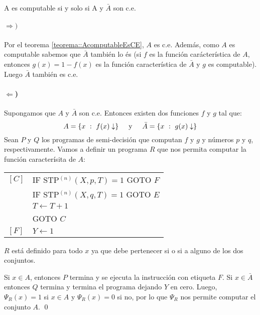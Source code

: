\begin{teorema}
	A es computable si y solo si A y $\bar{A}$ son c.e.
\end{teorema}

\begin{demo}
	\paragraph{$\bm{\Rightarrow})$} Por el teorema \ref{teorema::AcomputableEsCE}, $A$ es c.e. Además, como $A$ es computable sabemos que $\bar{A}$ también lo és (si $f$ es la función carácterística de $A$, entonces $g(x) = 1 - f(x)$ es la función característica de $\bar{A}$ y $g$ es computable). Luego $\bar{A}$ también es c.e.
		\paragraph{$\bm{\Leftarrow}$)} Supongamos que $A$ y $\bar{A}$ son c.e. Entonces existen dos funciones $f$ y $g$ tal que:
	$$A = \{ x~:~f(x)\downarrow\}\hspace*{0.5cm}\text{y}\hspace*{0.5cm} \bar{A} =\{x~:~g(x)\downarrow\}$$
	Sean $P$ y $Q$ los programas de semi-decisión que computan $f$ y $g$ y números $p$ y $q$, respectivamente. Vamos a definir un programa $R$ que nos permita computar la función caracterísita de $A$:

\begin{center}
	\begin{tabular}{ll}
		$[C]$ & IF STP$^{(n)}(X,p, T) = 1$ GOTO $F$ \\
		& IF STP$^{(n)}(X,q, T) = 1$ GOTO $E$ \\
		& $T\leftarrow T + 1$ \\
		& GOTO $C$ \\
		$[F]$ & $Y\leftarrow 1$
	\end{tabular}
\end{center} 
$R$ está definido para todo $x$ ya que debe pertenecer si o si a alguno de los dos conjuntos.	
\end{demo}
	\begin{demoPart}
 
 Si $x\in A$, entonces $P$ termina y se ejecuta la instrucción con etiqueta $F$. Si $x\in\bar{A}$ entonces $Q$ termina y termina el programa dejando $Y$ en cero. Luego, $\Psi_R(x) = 1$ si $x\in A$ y $\Psi_R(x) = 0$ si no, por lo que  $\Psi_R$ nos permite computar el conjunto $A$. \qed
\end{demoPart}

